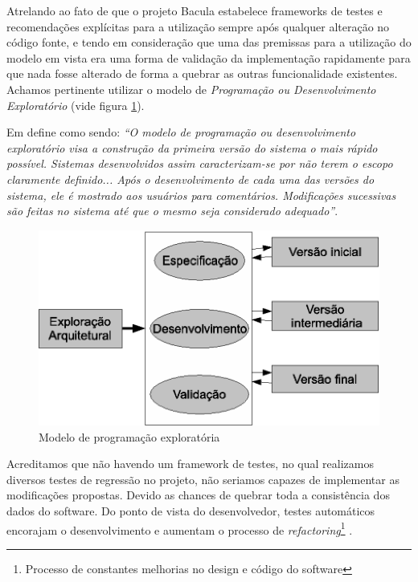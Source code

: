 Atrelando ao fato de que o projeto Bacula estabelece frameworks de testes e recomendações explícitas para a utilização sempre após qualquer alteração no código fonte, e tendo em consideração que uma das premissas para a utilização do modelo em vista era uma forma de validação da implementação rapidamente para que nada fosse alterado de forma a quebrar as outras funcionalidade existentes. Achamos pertinente utilizar o modelo de \textit{Programação ou Desenvolvimento Exploratório} (vide figura \ref{fig:exploratoria}). 

Em \cite[página 31]{engenharia1} define como sendo: \textit{``O modelo de programação ou desenvolvimento exploratório visa a construção da primeira versão do sistema o mais rápido possível. Sistemas desenvolvidos assim caracterizam-se por não terem o escopo claramente definido... Após o desenvolvimento de cada uma das versões do sistema, ele é mostrado aos usuários para comentários. Modificações sucessivas são feitas no sistema até que o mesmo seja considerado adequado''}.

\begin{figure}[h]
 \centering
 \includegraphics{../../doc/diagramas/programacao_exploratoria.eps}
 \caption[Programação exploratória]{Modelo de programação exploratória \cite{engenharia1}}
 \label{fig:exploratoria}
\end{figure}

Acreditamos que não havendo um framework de testes, no qual realizamos diversos testes de regressão no projeto, não seriamos capazes de implementar as modificações propostas. Devido as chances de quebrar toda a consistência dos dados do software. Do ponto de vista do desenvolvedor, testes automáticos encorajam o desenvolvimento e aumentam o processo de \textit{refactoring}\footnote{Processo de constantes melhorias no design e código do software} \cite[página 203]{producing}.

